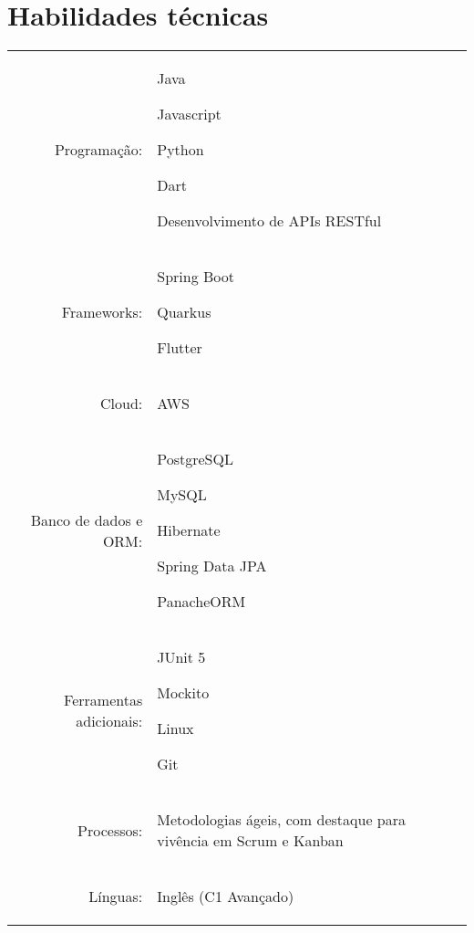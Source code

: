 \documentclass[a4paper,12pt]{article}
\newcommand{\postheadingspacing}{\vspace{6pt}}
\begin{document}
\section{Habilidades técnicas}
\postheadingspacing
\begin{tabular}{rp{15.2cm}}
\raggedleft Programação:
& \begin{itemize*}[label=\Large\textbullet]
    \item Java
    \item Javascript
    \item Python
    \item Dart
    \item Desenvolvimento de APIs RESTful
\end{itemize*}\\
\raggedleft Frameworks:
& \begin{itemize*}[label=\Large\textbullet]
    \item Spring Boot
    \item Quarkus
    \item Flutter
\end{itemize*}\\
\raggedleft Cloud:
& \begin{itemize*}[label=\Large\textbullet]
    \item AWS
\end{itemize*}\\
\raggedleft Banco de dados e ORM:
& \begin{itemize*}[label=\Large\textbullet]
    \item PostgreSQL
    \item MySQL
    \item Hibernate
    \item Spring Data JPA
    \item PanacheORM
\end{itemize*}\\
\raggedleft Ferramentas adicionais:
& \begin{itemize*}[label=\Large\textbullet]
    \item JUnit 5
    \item Mockito
    \item Linux
    \item Git
\end{itemize*}\\
\raggedleft Processos:
& \begin{itemize*}[label=\Large\textbullet]
    \item Metodologias ágeis, com destaque para vivência em Scrum e Kanban
\end{itemize*}\\
\raggedleft Línguas:
& \begin{itemize*}[label=\Large\textbullet]
    \item Inglês (C1 Avançado)
\end{itemize*}\\
\end{tabular}
\end{document}
